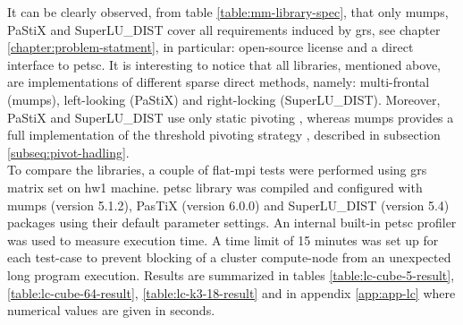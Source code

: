 It can be clearly observed, from table \ref{table:mm-library-spec}, that only \acrshort{mumps}, PaStiX and SuperLU\_DIST cover all requirements induced by \acrshort{grs}, see chapter \ref{chapter:problem-statment}, in particular: open-source license and a direct interface to \acrshort{petsc}. It is interesting to notice that all libraries, mentioned above, are implementations of different sparse direct methods, namely: multi-frontal (\acrshort{mumps}), left-looking (PaStiX) and right-locking (SuperLU\_DIST). Moreover, PaStiX and SuperLU\_DIST use only static pivoting \cite{pastix-manual}, \cite{superlu-manual} whereas \acrshort{mumps} provides a full implementation of the threshold pivoting strategy \cite{mumps-manual}, described in subsection \ref{subseq:pivot-hadling}.\\


To compare the libraries, a couple of flat-\acrshort{mpi} tests were performed using \acrshort{grs} matrix set on \gls{hw1} machine. \acrshort{petsc} library was compiled and configured with \acrshort{mumps} (version 5.1.2), PasTiX (version 6.0.0) and SuperLU\_DIST (version 5.4) packages using their default parameter settings. An internal built-in \acrshort{petsc} profiler was used to measure execution time.  A time limit of 15 minutes was set up for each test-case to prevent blocking of a cluster compute-node from an unexpected long program execution. Results are summarized in tables \ref{table:lc-cube-5-result}, \ref{table:lc-cube-64-result}, \ref{table:lc-k3-18-result} and in appendix \ref{app:app-lc} where numerical values are given in seconds.\\



